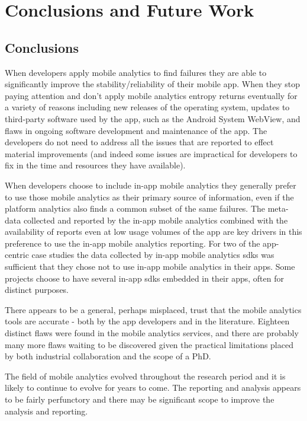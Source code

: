 \setchapterpreamble[u]{\margintoc}
\chapter{Conclusions and Future Work}\label{chapter-conclusions-and-future-work}

\section{Conclusions}
When developers apply mobile analytics to find failures they are able to significantly improve the stability/reliability of their mobile app. When they stop paying attention and don't apply mobile analytics entropy returns eventually for a variety of reasons including new releases of the operating system, updates to third-party software used by the app, such as the Android System WebView, and flaws in ongoing software development and maintenance of the app. The developers do not need to address all the issues that are reported to effect material improvements (and indeed some issues are impractical for developers to fix in the time and resources they have available).

When developers choose to include in-app mobile analytics they generally prefer to use those mobile analytics as their primary source of information, even if the platform analytics also finds a common subset of the same failures. The meta-data collected and reported by the in-app mobile analytics combined with the availability of reports even at low usage volumes of the app are key drivers in this preference to use the in-app mobile analytics reporting. For two of the app-centric case studies the data collected by in-app mobile analytics \Glspl{sdk} was sufficient that they chose not to use in-app mobile analytics in their apps. Some projects choose to have several in-app \Glspl{sdk} embedded in their apps, often for distinct purposes.

There appears to be a general, perhaps misplaced, trust that the mobile analytics tools are accurate - both by the app developers and in the literature. Eighteen distinct flaws were found in the mobile analytics services, and there are probably many more flaws waiting to be discovered given the practical limitations placed by both industrial collaboration and the scope of a PhD. 

The field of mobile analytics evolved throughout the research period and it is likely to continue to evolve for years to come. The reporting and analysis appears to be fairly perfunctory and there may be significant scope to improve the analysis and reporting.

